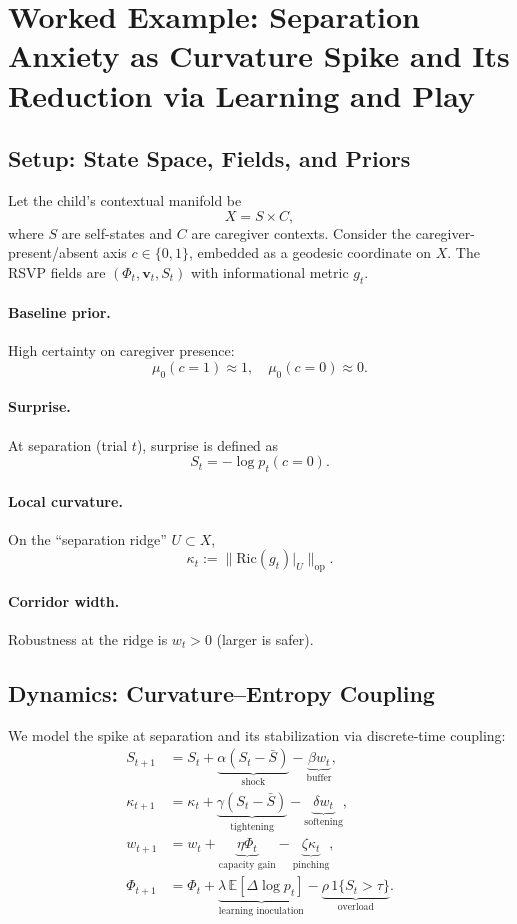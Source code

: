 \documentclass{article}
\theoremstyle{definition}
\begin{document}
\section{Worked Example: Separation Anxiety as Curvature Spike and Its Reduction via Learning and Play}

\subsection{Setup: State Space, Fields, and Priors}

Let the child’s contextual manifold be 
\[
X = S \times C,
\]
where $S$ are self-states and $C$ are caregiver contexts. Consider the caregiver-present/absent axis $c \in \{0,1\}$, embedded as a geodesic coordinate on $X$. The RSVP fields are $(\Phi_t, \mathbf{v}_t, S_t)$ with informational metric $g_t$.

\paragraph{Baseline prior.} High certainty on caregiver presence:
\[
\mu_0(c=1) \approx 1, \quad \mu_0(c=0) \approx 0.
\]

\paragraph{Surprise.} At separation (trial $t$), surprise is defined as
\[
S_t = - \log p_t(c=0).
\]

\paragraph{Local curvature.} On the ``separation ridge'' $U \subset X$,
\[
\kappa_t := \| \mathrm{Ric}(g_t)|_U \|_{\mathrm{op}}.
\]

\paragraph{Corridor width.} Robustness at the ridge is $w_t > 0$ (larger is safer).

\subsection{Dynamics: Curvature–Entropy Coupling}

We model the spike at separation and its stabilization via discrete-time coupling:
\begin{align*}
S_{t+1} &= S_t + \underbrace{\alpha (S_t - \bar{S})}_{\text{shock}}
                     - \underbrace{\beta w_t}_{\text{buffer}}, \\[4pt]
\kappa_{t+1} &= \kappa_t + \underbrace{\gamma (S_t - \bar{S})}_{\text{tightening}}
                     - \underbrace{\delta w_t}_{\text{softening}}, \\[4pt]
w_{t+1} &= w_t + \underbrace{\eta \Phi_t}_{\text{capacity gain}}
                 - \underbrace{\zeta \kappa_t}_{\text{pinching}}, \\[4pt]
\Phi_{t+1} &= \Phi_t + \underbrace{\lambda \, \mathbb{E}[\Delta \log p_t]}_{\text{learning inoculation}}
                      - \underbrace{\rho \, 1\{S_t > \tau\}}_{\text{overload}}.
\end{align*}
\end{document}
